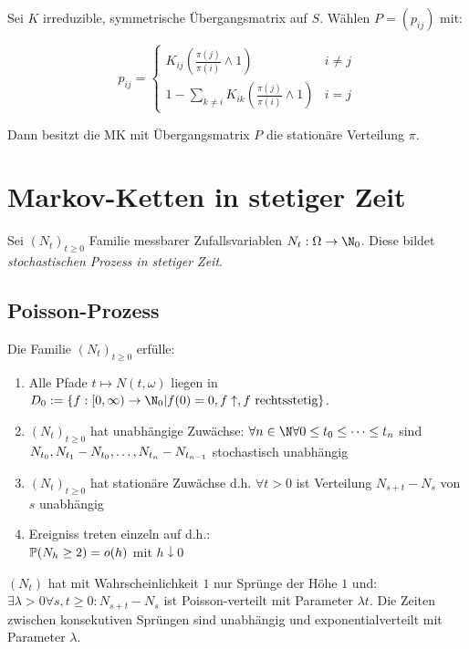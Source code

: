 Sei $K$ irreduzible, symmetrische Übergangsmatrix auf $S$. Wählen $P = (p_{ij})$ mit:

\[ p_{ij} = \begin{cases} K_{ij}\left(\frac{\pi(j)}{\pi(i)} \land 1\right) & i \neq j \\ 1 - \sum_{k \neq i} K_{ik}\left(\frac{\pi(j)}{\pi(i)} \land 1\right) & i=j \end{cases} \]

Dann besitzt die MK mit Übergangsmatrix $P$ die stationäre Verteilung $\pi$.

\section*{Markov-Ketten in stetiger Zeit}

Sei $(N_t)_{t\geq 0}$ Familie messbarer Zufallsvariablen $N_t : \Omega \to \N_0$. Diese bildet \emph{stochastischen Prozess in stetiger Zeit}.

\subsection*{Poisson-Prozess}

Die Familie $(N_t)_{t\geq 0}$ erfülle:

\begin{enumerate}[label=(\alph*)]
	\item Alle Pfade $t \mapsto N(t,\omega)$ liegen in $D_0 := \{ f : [0,\infty) \to \N_0 | f(0) = 0, f \uparrow, f \text{ rechtsstetig}\}$.
	\item $(N_t)_{t\geq0}$ hat unabhängige Zuwächse: $\forall n \in \N \\ \forall 0 \leq t_0 \leq \cdots \leq t_n$ sind $N_{t_0}, N_{t_1}-N_{t_0}, \dots, \\ N_{t_n}-N_{t_{n-1}}$ stochastisch unabhängig
	\item $(N_t)_{t\geq0}$ hat stationäre Zuwächse d.h. $\forall t > 0$ ist Verteilung $N_{s+t}-N_s$ von $s$ unabhängig
	\item Ereigniss treten einzeln auf d.h.: \\ $\P(N_h \geq 2) = o(h)$ mit $h \downarrow 0$
\end{enumerate}

$(N_t)$ hat mit Wahrscheinlichkeit $1$ nur Sprünge der Höhe $1$ und: $\exists \lambda > 0 \forall s, t \geq 0 : N_{s+t}-N_s$ ist Poisson-verteilt mit Parameter $\lambda t$. Die Zeiten zwischen konsekutiven Sprüngen sind unabhängig und exponentialverteilt mit Parameter $\lambda$.

